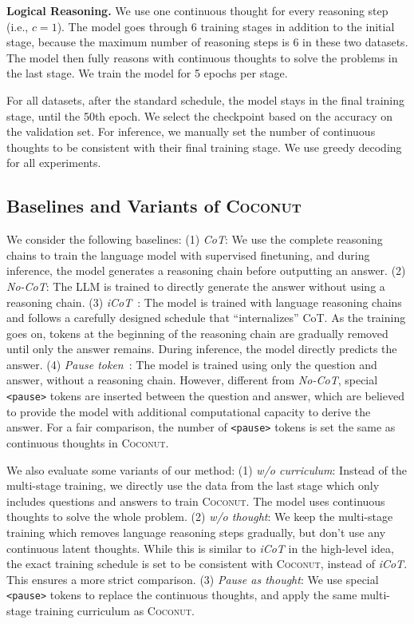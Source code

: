 \documentclass[]{fairmeta}
\newcommand{\ours}{\textsc{Coconut}\xspace}
\begin{document}
\noindent\textbf{Logical Reasoning. }
We use one continuous thought for every reasoning step (i.e., $c=1$). The model goes through 6 training stages in addition to the initial stage, because the maximum number of reasoning steps is 6 in these two datasets. The model then fully reasons with continuous thoughts to solve the problems in the last stage. We train the model for 5 epochs per stage.

For all datasets, after the standard schedule, the model stays in the final training stage, until the 50th epoch. We select the checkpoint based on the accuracy on the validation set. For inference, we manually set the number of continuous thoughts to be consistent with their final training stage. We use greedy decoding for all experiments. 

\subsection{Baselines and Variants of \ours}
We consider the following baselines: (1) \textit{CoT}: We use the complete reasoning chains to train the language model with supervised finetuning, and during inference, the model generates a reasoning chain before outputting an answer. (2) \textit{No-CoT}: The LLM is trained to directly generate the answer without using a reasoning chain. (3) \textit{iCoT}~\citep{deng2024explicit}: The model is trained with language reasoning chains and follows a carefully designed schedule that ``internalizes'' CoT. As the training goes on, tokens at the beginning of the reasoning chain are gradually removed until only the answer remains. During inference, the model directly predicts the answer. (4) \textit{Pause token}~\citep{goyal2023think}: The model is trained using only the question and answer, without a reasoning chain. However, different from \textit{No-CoT}, special \texttt{<pause>} tokens are inserted between the question and answer, which are believed to provide the model with additional computational capacity to derive the answer. For a fair comparison, the number of \texttt{<pause>} tokens is set the same as continuous thoughts in \ours.


We also evaluate some variants of our method: (1) \textit{w/o curriculum}: Instead of the multi-stage training, we directly use the data from the last stage which only includes questions and answers to train \ours. The model uses continuous thoughts to solve the whole problem. (2) \textit{w/o thought}: We keep the multi-stage training which removes language reasoning steps gradually, but don't use any continuous latent thoughts. While this is similar to \textit{iCoT} in the high-level idea, the exact training schedule is set to be consistent with \ours, instead of \textit{iCoT}. This ensures a more strict comparison. (3) \textit{Pause as thought}: We use special \texttt{<pause>} tokens to replace the continuous thoughts, and apply the same multi-stage training curriculum as \ours.
\end{document}
